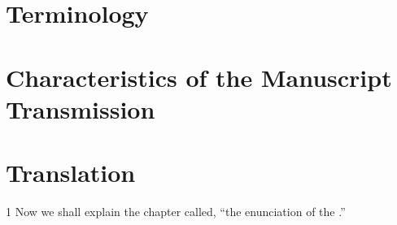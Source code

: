 \section{Terminology}



\section{Characteristics of the Manuscript Transmission}


\section{Translation}

\begin{translation}

\item [1] Now we shall explain the chapter called, “the enunciation of the
.”


\end{translation}
